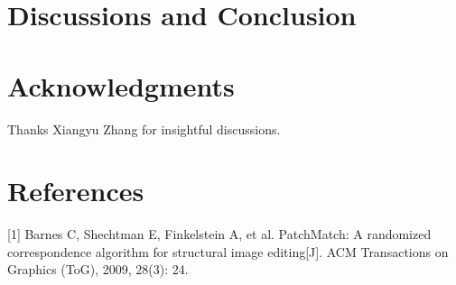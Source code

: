 \documentclass{article}
\begin{document}
\section{Discussions and Conclusion}


\section*{Acknowledgments}
Thanks Xiangyu Zhang for insightful discussions.
\section*{References}

\medskip

\small

[1] Barnes C, Shechtman E, Finkelstein A, et al. PatchMatch: A randomized correspondence algorithm for structural image editing[J]. ACM Transactions on Graphics (ToG), 2009, 28(3): 24.


\end{document}
